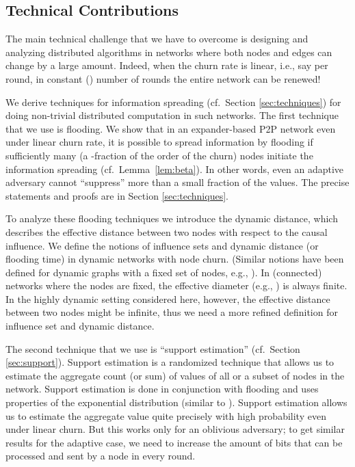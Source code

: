 \documentclass[leqno,11pt]{article}
\begin{document}
\subsection{Technical Contributions}
The main technical challenge that we have to overcome is designing and analyzing
distributed algorithms in networks where both nodes and edges can change by a large amount.
Indeed, when the churn rate is linear, i.e., say  per round, in constant () number of rounds the entire network can be renewed!
 
We derive techniques for information spreading  (cf.\ Section
\ref{sec:techniques}) for doing non-trivial distributed computation in such networks. The first technique that we use
is flooding.   We show that in an expander-based
P2P network even under linear churn rate, it is possible to spread
information by flooding if  sufficiently many (a -fraction of the
order of the churn)
nodes initiate the information spreading (cf.~Lemma~\ref{lem:beta}). In other words,  even an adaptive adversary 
cannot ``suppress'' more than  a small fraction
of the values. The precise statements
and proofs are in Section \ref{sec:techniques}. 

To analyze these flooding techniques we introduce the dynamic
distance, which describes the effective distance between two nodes with respect
to the causal influence. We define the notions of influence sets and dynamic
distance (or flooding time) in dynamic networks with node churn.  (Similar
notions have been defined for dynamic graphs with
a fixed set of nodes, e.g., \cite{kuhn-survey,BCF09}).  In (connected) networks
where the nodes are fixed, the effective diameter (e.g., \cite{kuhn-survey}) is
always finite. In the highly dynamic setting considered here, however, the
effective distance between two nodes might be infinite, thus we need a more
refined definition for influence set and dynamic distance.

The second technique that we use is ``support estimation'' (cf.\ Section
\ref{sec:support}). Support estimation is a randomized technique that allows us to estimate the aggregate count (or sum)
of values of all or a subset of nodes in the network. Support estimation is done in conjunction with flooding
and uses properties of the exponential distribution (similar to \cite{Cohen97, AoyamaS08}).
Support estimation allows us to estimate the aggregate value quite precisely
with high probability even under linear churn. But this works only for an
oblivious adversary; to get similar results for the adaptive case, we need to
increase the amount of bits that can be processed and sent by a node in every
round. 
\end{document}
